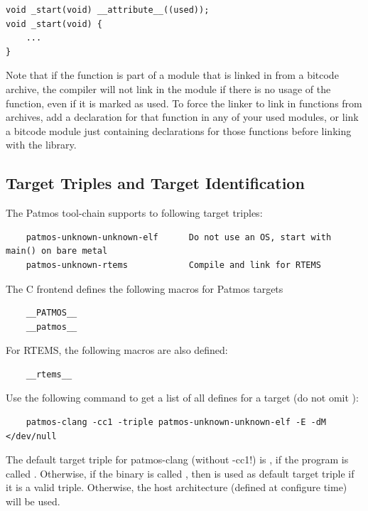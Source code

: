 \begin{verbatim}
void _start(void) __attribute__((used));
void _start(void) {
    ...
}
\end{verbatim}

Note that if the function is part of a module that is linked in from a bitcode archive,
the compiler will not link in the module if there is no usage of the function, even if it
is marked as used. To force the linker to link in functions from archives, add a declaration
for that function in any of your used modules, or link a bitcode module just containing declarations
for those functions before linking with the library.


\subsection{Target Triples and Target Identification}

The Patmos tool-chain supports to following target triples:

\begin{verbatim}
    patmos-unknown-unknown-elf      Do not use an OS, start with main() on bare metal
    patmos-unknown-rtems            Compile and link for RTEMS
\end{verbatim}

The C frontend defines the following macros for Patmos targets

\begin{verbatim}
    __PATMOS__
    __patmos__
\end{verbatim}

For RTEMS, the following macros are also defined:

\begin{verbatim}
    __rtems__
\end{verbatim}

Use the following command to get a list of all defines for a target (do not omit ):

\begin{verbatim}
    patmos-clang -cc1 -triple patmos-unknown-unknown-elf -E -dM </dev/null
\end{verbatim}

The default target triple for patmos-clang (without -cc1!) is ,
if the program is called . Otherwise, if the binary is called
, then  is used as default target triple if it is a valid triple.
Otherwise, the host architecture (defined at configure time) will be used.



